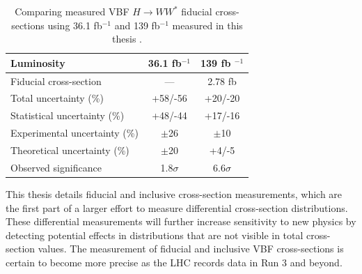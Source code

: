 \begin{table}[!h]
  \begin{center}
    \begin{tabular}{|l|c|c|}
       \hline
        Luminosity & 36.1 fb$^{-1}$    & 139 fb $^{-1}$ \\
      \hline
	Fiducial cross-section & --- & 2.78 fb \\ 
	Total uncertainty (\%) & +58/-56 & +20/-20 \\
	Statistical uncertainty (\%) & +48/-44 & +17/-16 \\
        Experimental uncertainty (\%) & $\pm$26 & $\pm$10 \\
        Theoretical uncertainty (\%) & $\pm$20 & +4/-5 \\
        Observed significance & 1.8$\sigma$& 6.6$\sigma$ \\
	\hline 
    \end{tabular}
    \caption{Comparing measured VBF $H\rightarrow WW^*$ fiducial cross-sections using 36.1 fb$^{-1}$ and 139 fb$^{-1}$ measured in this thesis \cite{HWW2016}.}
    \label{tab:comparison}
  \end{center}
\end{table}

This thesis details fiducial and inclusive cross-section measurements, which are the first part of a larger effort to measure differential cross-section distributions. These differential measurements will further increase sensitivity to new physics by detecting potential effects in distributions that are not visible in total cross-section values. The measurement of fiducial and inclusive VBF cross-sections is certain to become more precise as the LHC records data in Run 3 and beyond. 
